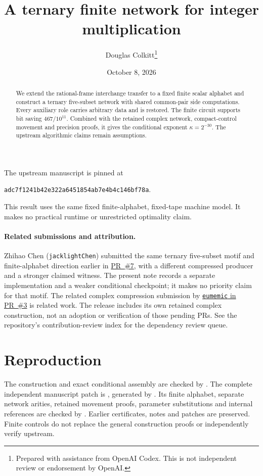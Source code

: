 \documentclass[11pt]{article}
\title{A ternary finite network for integer multiplication}
\author{Douglas Colkitt\thanks{Prepared with assistance from OpenAI Codex.
This is not independent review or endorsement by OpenAI.}}
\date{October 8, 2026}
\begin{document}
\maketitle
\begin{abstract}
We extend the rational-frame interchange transfer to a fixed finite scalar
alphabet and construct a ternary five-subset network with shared common-pair
side computations. Every auxiliary role carries arbitrary data and is
restored. The finite circuit supports bit saving $467/10^{11}$. Combined
with the retained complex network, compact-control movement and precision
proofs, it gives the conditional exponent $\kappa=2^{-30}$.
The upstream algorithmic claims remain assumptions.
\end{abstract}
The upstream manuscript is pinned at
\begin{center}\texttt{adc7f1241b42e322a6451854ab7e4b4c146bf78a}.\end{center}
This result uses the same fixed finite-alphabet, fixed-tape machine model.
It makes no practical runtime or unrestricted optimality claim.
\paragraph{Related submissions and attribution.}
Zhihao Chen (\texttt{jacklightChen}) submitted the same ternary five-subset
motif and finite-alphabet direction earlier in
\href{https://github.com/CrocSwap/integer-mult-bounds/pull/7}{PR~\#7},
with a different compressed producer and a stronger claimed witness.
The present note records a separate implementation and a weaker conditional
checkpoint; it makes no priority claim for that motif. The related complex
compression submission by
\href{https://github.com/CrocSwap/integer-mult-bounds/pull/3}{\texttt{eumemic}
in PR~\#3} is related work. The release includes its own retained complex
construction, not an adoption or verification of those pending PRs.
See the repository's contribution-review index for the dependency review queue.



\section{Reproduction}
The construction and exact conditional assembly are checked by
. The complete independent manuscript
patch is , generated by
. Its finite alphabet, separate network
arities, retained movement proofs, parameter substitutions and internal
references are checked by .
Earlier certificates, notes and patches are preserved. Finite controls do
not replace the general construction proofs or independently verify upstream.
\end{document}
